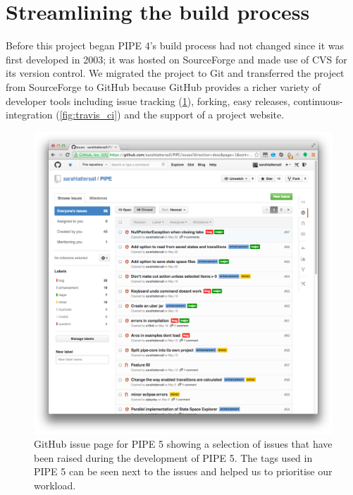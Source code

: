 \section{Streamlining the build process}
Before this project began PIPE 4's build process had not changed since it was first developed in 2003; it was hosted on SourceForge and made use of CVS for its version control. We migrated the project to Git and transferred the project from SourceForge to GitHub because GitHub provides a richer variety of developer tools including issue tracking (\cref{fig:gh_issues}), forking, easy releases, continuous-integration (\cref{fig:travis_ci}) and the support of a project website.

\mediumlinespacing
\begin{figure}[tb]
\begin{center}
    \includegraphics[width=\linewidth]{build/gh_issues.png} 
    \caption{GitHub issue page for PIPE 5 showing a selection of issues that have been raised during the development of PIPE 5. The tags used in PIPE 5 can be seen next to the issues and helped us to prioritise our workload.}
    \label{fig:gh_issues}
\end{center}
\end{figure}


